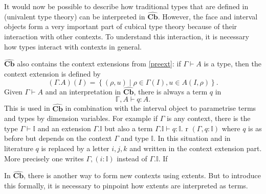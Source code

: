 \documentclass[12pt,a4paper,twoside,xetex]{book} %
\newcommand{\psh}[1]{\widehat{#1}}
\newcommand{\cube}[0]{\textbf{Cb}}
\begin{document}
It would now be possible to describe how traditional types that are defined in 
(univalent type theory) can be interpreted in $\psh{\cube}$. 
However, the face and interval objects form a very important part of cubical 
type theory because of their interaction with other contexts. To understand 
this interaction, it is necessary how types interact with contexts in general.  

$\psh{\cube}$ also contains the context extensions from 
\cref{preext}: if $\Gamma \vdash A$ is a type, then the context extension is 
defined by $$(\Gamma . A)(I) = \left\{ (\rho , u ) \mid \rho \in \Gamma (I), u 
\in A (I,\rho) \right\}.$$
Given $\Gamma \vdash A$ and an interpretation in $\psh{\cube}$, there is 
always a term $q$ in $$\mathbb{\Gamma}, A \vdash q : A.$$ This is used in 
$\psh{\cube}$ in combination with the interval object to parametrise 
terms and types by dimension variables. For example if $\Gamma$ is any context, 
there is the type $\Gamma \vdash \mathbb{I}$ and an extension $\Gamma. 
\mathbb{I}$ but also a term $\Gamma. \mathbb{I} \vdash q : \mathbb{I}$.
r $(\Gamma, q : \mathbb{I})$ where $q$ is as before but depends on the context 
$\Gamma$ and type $\mathbb{I}$. In this situation and in literature $q$ is 
replaced by a letter $i,j,k$ and written in the context extension part. More 
precisely one writes $\Gamma, (i: \mathbb{I})$ instead of $\Gamma . 
\mathbb{I}$. If 

In $\psh{\cube}$, there is another way to form new 
contexts using extents. But to introduce this formally, it is necessary to 
pinpoint how extents are interpreted as terms.
\end{document}

